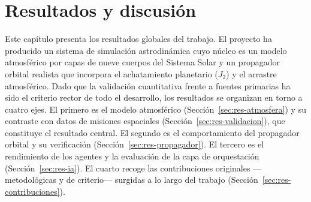 \chapter{Resultados y discusión}
\label{ch:resultados}

Este capítulo presenta los resultados globales del trabajo. El proyecto ha producido un sistema de simulación astrodinámica cuyo núcleo es un modelo atmosférico por capas de nueve cuerpos del Sistema Solar y un propagador orbital realista que incorpora el achatamiento planetario ($J_2$) y el arrastre atmosférico. Dado que la validación cuantitativa frente a fuentes primarias ha sido el criterio rector de todo el desarrollo, los resultados se organizan en torno a cuatro ejes. El primero es el modelo atmosférico (Sección~\ref{sec:res-atmosfera}) y su contraste con datos de misiones espaciales (Sección~\ref{sec:res-validacion}), que constituye el resultado central. El segundo es el comportamiento del propagador orbital y su verificación (Sección~\ref{sec:res-propagador}). El tercero es el rendimiento de los agentes y la evaluación de la capa de orquestación (Sección~\ref{sec:res-ia}). El cuarto recoge las  contribuciones originales ---metodológicas y de criterio--- surgidas a lo largo del trabajo (Sección~\ref{sec:res-contribuciones}).

